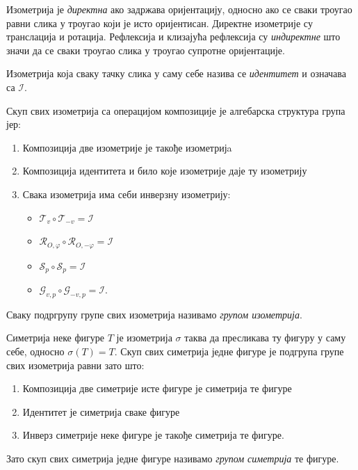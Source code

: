 \documentclass[12pt]{article}
\begin{document}
Изометрија је \emph{директна} ако задржава оријентацију, односно ако се сваки троугао равни слика у троугао који је исто оријентисан. Директне изометрије су транслација и ротација. Рефлексија и клизајућа рефлексија су \emph{индиректне} што значи да се сваки троугао слика у троугао супротне оријентације.

Изометрија која сваку тачку слика у саму себе назива се \emph{идентитет} и означава са $\mathcal{I}$.

Скуп свих изометрија са операцијом композиције је алгебарска структура група јер:
\begin{enumerate}
\item Композиција две изометрије је такође изометријa
    \item Композиција идентитета и било које изометрије даје ту изометрију
    
    \item Свака изометрија има себи инверзну изометрију:
    \begin{itemize}
        \item $\mathcal{T}_v \circ \mathcal{T}_{-v} = \mathcal{I}$
        \item $\mathcal{R}_{O,\varphi} \circ \mathcal{R}_{O,-\varphi} = \mathcal{I}$
        \item $\mathcal{S}_p \circ \mathcal{S}_p = \mathcal{I}$
        \item $\mathcal{G}_{v,p} \circ \mathcal{G}_{-v,p} = \mathcal{I}$.
    \end{itemize}
    
\end{enumerate}

Сваку подргрупу групе свих изометрија називамо \emph{групом изометрија}. 

Симетрија неке фигуре $T$ је изометрија $\sigma$ таква да пресликава ту фигуру у саму себе, односно $\sigma(T) = T$. Скуп свих симетрија једне фигуре је подгрупа групе свих изометрија равни зато што:
\begin{enumerate}
    \item Композиција две симетрије исте фигуре је симетрија те фигуре
    \item Идентитет је симетрија сваке фигуре
    \item Инверз симетрије неке фигуре је такође симетрија те фигуре.

\end{enumerate}

Зато скуп свих симетрија једне фигуре називамо \emph{групом симетрија} те фигуре.
\end{document}
